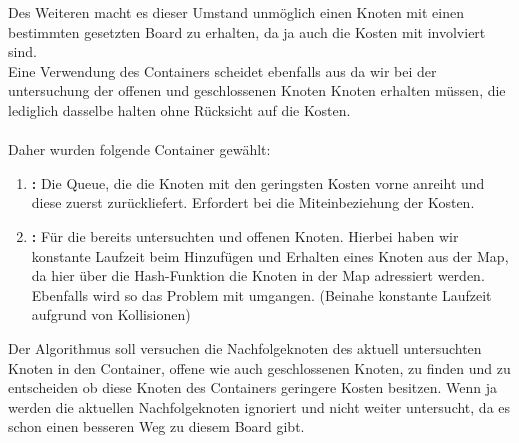 \documentclass[11pt, a4paper, twoside]{article}   	%
\begin{document}
Des Weiteren macht es dieser Umstand unmöglich einen Knoten mit einen bestimmten gesetzten Board zu erhalten, da ja auch die Kosten mit involviert sind.\\
Eine Verwendung des Containers  scheidet ebenfalls aus da wir bei der untersuchung der offenen und geschlossenen Knoten Knoten erhalten müssen, die lediglich dasselbe  halten ohne Rücksicht auf die Kosten. \\\\
Daher wurden folgende Container gewählt:\
\begin{enumerate}
	\item \textbf{:} Die Queue, die die Knoten mit den geringsten Kosten vorne anreiht und diese zuerst zurückliefert. Erfordert bei  die Miteinbeziehung der Kosten.
	\item \textbf{\inlineJavaSource{HashMap<Board<T>, SearchNode<T>>}: } Für die bereits untersuchten und offenen Knoten. Hierbei haben wir konstante Laufzeit beim Hinzufügen und Erhalten eines Knoten aus der Map, da hier über die Hash-Funktion  die Knoten in der Map adressiert werden. Ebenfalls wird so das Problem mit  umgangen. (Beinahe konstante Laufzeit aufgrund von Kollisionen) 
\end{enumerate}
Der Algorithmus soll versuchen die Nachfolgeknoten des aktuell untersuchten Knoten in den Container, offene wie auch geschlossenen Knoten, zu finden und zu entscheiden ob diese Knoten des Containers geringere Kosten besitzen. Wenn ja werden die aktuellen Nachfolgeknoten ignoriert und nicht weiter untersucht, da es schon einen besseren Weg zu diesem Board gibt.

\newpage
\end{document}
